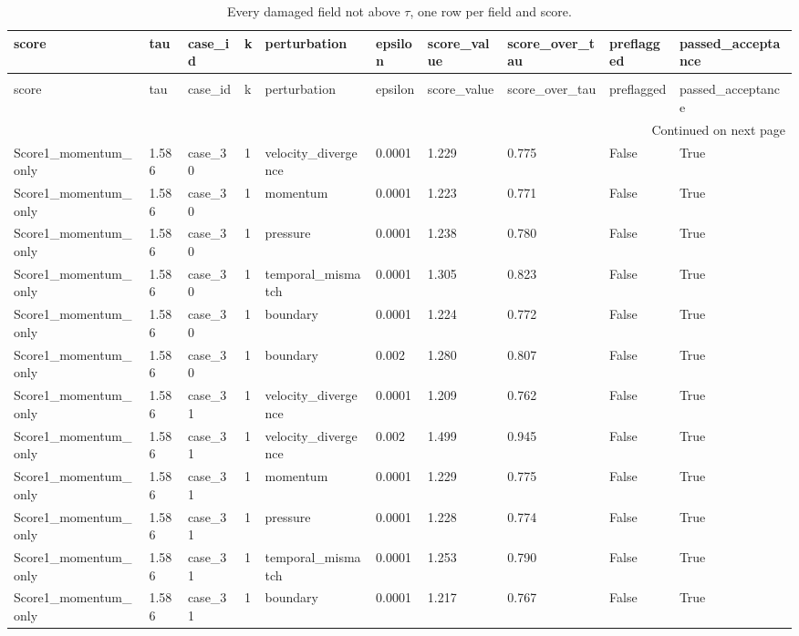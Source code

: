 \begin{longtable}{llllllllll}
\caption{Every damaged field not above $\tau$, one row per field and score.} \label{tab:benchmark_missed_detections} \\
\toprule
score & tau & case\_id & k & perturbation & epsilon & score\_value & score\_over\_tau & preflagged & passed\_acceptance \\
\midrule
\endfirsthead
\caption[]{Every damaged field not above $\tau$, one row per field and score.} \\
\toprule
score & tau & case\_id & k & perturbation & epsilon & score\_value & score\_over\_tau & preflagged & passed\_acceptance \\
\midrule
\endhead
\midrule
\multicolumn{10}{r}{Continued on next page} \\
\midrule
\endfoot
\bottomrule
\endlastfoot
Score1\_momentum\_only & 1.586 & case\_30 & 1 & velocity\_divergence & 0.0001 & 1.229 & 0.775 & False & True \\
Score1\_momentum\_only & 1.586 & case\_30 & 1 & momentum & 0.0001 & 1.223 & 0.771 & False & True \\
Score1\_momentum\_only & 1.586 & case\_30 & 1 & pressure & 0.0001 & 1.238 & 0.780 & False & True \\
Score1\_momentum\_only & 1.586 & case\_30 & 1 & temporal\_mismatch & 0.0001 & 1.305 & 0.823 & False & True \\
Score1\_momentum\_only & 1.586 & case\_30 & 1 & boundary & 0.0001 & 1.224 & 0.772 & False & True \\
Score1\_momentum\_only & 1.586 & case\_30 & 1 & boundary & 0.002 & 1.280 & 0.807 & False & True \\
Score1\_momentum\_only & 1.586 & case\_31 & 1 & velocity\_divergence & 0.0001 & 1.209 & 0.762 & False & True \\
Score1\_momentum\_only & 1.586 & case\_31 & 1 & velocity\_divergence & 0.002 & 1.499 & 0.945 & False & True \\
Score1\_momentum\_only & 1.586 & case\_31 & 1 & momentum & 0.0001 & 1.229 & 0.775 & False & True \\
Score1\_momentum\_only & 1.586 & case\_31 & 1 & pressure & 0.0001 & 1.228 & 0.774 & False & True \\
Score1\_momentum\_only & 1.586 & case\_31 & 1 & temporal\_mismatch & 0.0001 & 1.253 & 0.790 & False & True \\
Score1\_momentum\_only & 1.586 & case\_31 & 1 & boundary & 0.0001 & 1.217 & 0.767 & False & True \\

\end{longtable}
